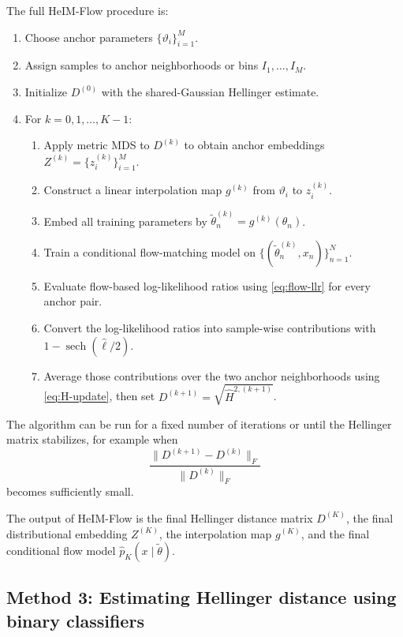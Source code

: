 The full HeIM-Flow procedure is:
\begin{enumerate}
    \item Choose anchor parameters $\{\vartheta_i\}_{i=1}^M$.
    \item Assign samples to anchor neighborhoods or bins $I_1,\ldots,I_M$.
    \item Initialize $D^{(0)}$ with the shared-Gaussian Hellinger estimate.
    \item For $k=0,1,\ldots,K-1$:
    \begin{enumerate}
        \item Apply metric MDS to $D^{(k)}$ to obtain anchor embeddings $Z^{(k)}=\{z_i^{(k)}\}_{i=1}^M$.
        \item Construct a linear interpolation map $g^{(k)}$ from $\vartheta_i$ to $z_i^{(k)}$.
        \item Embed all training parameters by $\tilde{\theta}_n^{(k)}=g^{(k)}(\theta_n)$.
        \item Train a conditional flow-matching model on $\{(\tilde{\theta}_n^{(k)},x_n)\}_{n=1}^N$.
        \item Evaluate flow-based log-likelihood ratios using \eqref{eq:flow-llr} for every anchor pair.
        \item Convert the log-likelihood ratios into sample-wise contributions with $1-\operatorname{sech}(\widehat{\ell}/2)$.
        \item Average those contributions over the two anchor neighborhoods using \eqref{eq:H-update}, then set $D^{(k+1)}=\sqrt{\widehat H^{2,(k+1)}}$.
    \end{enumerate}
\end{enumerate}
The algorithm can be run for a fixed number of iterations or until the Hellinger matrix stabilizes, for example when
\begin{equation}
    \frac{\|D^{(k+1)}-D^{(k)}\|_F}{\|D^{(k)}\|_F}
\end{equation}
becomes sufficiently small.

The output of HeIM-Flow is the final Hellinger distance matrix $D^{(K)}$, the final distributional embedding $Z^{(K)}$, the interpolation map $g^{(K)}$, and the final conditional flow model $\widehat p_K(x\mid \tilde\theta)$.

\subsection{Method 3: Estimating Hellinger distance using binary classifiers}
\label{sec:implemented-clf-init}

